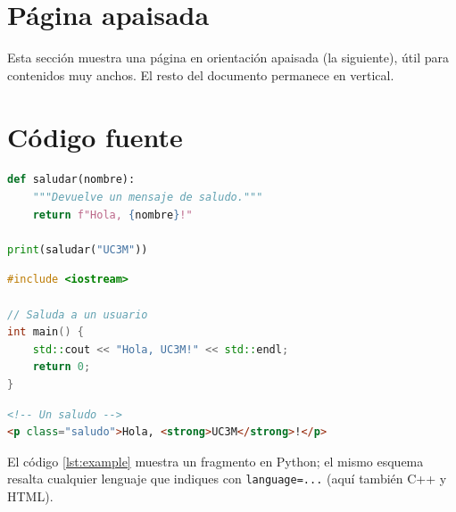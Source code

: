 \section{Página apaisada}

Esta sección muestra una página en orientación apaisada (la siguiente), útil
para contenidos muy anchos. El resto del documento permanece en vertical.

\begin{tfglandscape}
\lipsum[1]
\end{tfglandscape}



\section{Código fuente}

\begin{lstlisting}[language=Python,caption={Una función sencilla en Python},label={lst:example}]
def saludar(nombre):
    """Devuelve un mensaje de saludo."""
    return f"Hola, {nombre}!"

print(saludar("UC3M"))
\end{lstlisting}

\begin{lstlisting}[language=C++,caption={Una función sencilla en C++}]
#include <iostream>

// Saluda a un usuario
int main() {
    std::cout << "Hola, UC3M!" << std::endl;
    return 0;
}
\end{lstlisting}

\begin{lstlisting}[language=HTML,caption={Un fragmento de HTML}]
<!-- Un saludo -->
<p class="saludo">Hola, <strong>UC3M</strong>!</p>
\end{lstlisting}

El código \ref{lst:example} muestra un fragmento en Python; el mismo esquema
resalta cualquier lenguaje que indiques con \texttt{language=...} (aquí también C++ y HTML).



